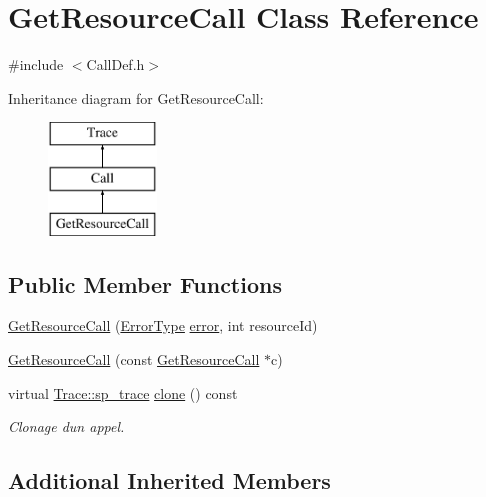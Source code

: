 \hypertarget{class_get_resource_call}{}\section{Get\+Resource\+Call Class Reference}
\label{class_get_resource_call}


{\ttfamily \#include $<$Call\+Def.\+h$>$}

Inheritance diagram for Get\+Resource\+Call\+:\begin{figure}[H]
\begin{center}
\leavevmode
\includegraphics[height=3.000000cm]{class_get_resource_call}
\end{center}
\end{figure}
\subsection*{Public Member Functions}
\begin{DoxyCompactItemize}
\item 
\hyperlink{class_get_resource_call_aad3bb58fedeed2204ed45537021bb696}{Get\+Resource\+Call} (\hyperlink{class_call_ade833a08ce215aaa4121102f3448c898}{Error\+Type} \hyperlink{class_call_a206f6150a8038fda48c17c2c7421aed1}{error}, int resource\+Id)
\item 
\hyperlink{class_get_resource_call_a1ee622f0e449e11767b9054a46d50f87}{Get\+Resource\+Call} (const \hyperlink{class_get_resource_call}{Get\+Resource\+Call} $\ast$c)
\item 
virtual \hyperlink{class_trace_a9c58e523529fc8a03fb6acf3eef86150}{Trace\+::sp\+\_\+trace} \hyperlink{class_get_resource_call_adeda1479826fb33c27c76bd8fe711776}{clone} () const 
\begin{DoxyCompactList}\small\item\em Clonage d\textquotesingle{}un appel. \end{DoxyCompactList}\end{DoxyCompactItemize}
\subsection*{Additional Inherited Members}



